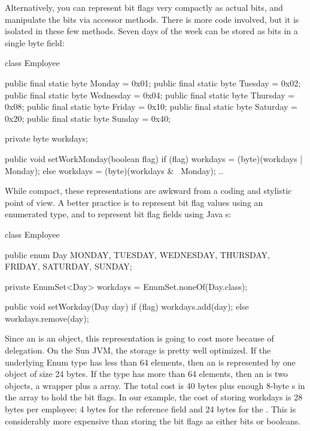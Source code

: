 Alternatively, you can represent bit flags very compactly as actual bits, and
manipulate the bits via accessor methods. There is more code involved,
but it is isolated in these few methods. Seven days of the week can be stored as
bits in a single byte field:

\begin{shortlisting}
	class Employee {
	
		public final static byte Monday = 0x01;
		public final static byte Tuesday = 0x02;
		public final static byte Wednesday = 0x04;
		public final static byte Thursday = 0x08;
		public final static byte Friday = 0x10;
		public final static byte Saturday = 0x20;
		public final static byte Sunday = 0x40;
		
		private byte workdays;
		
		public void setWorkMonday(boolean flag) {
			if (flag) {
				workdays = (byte)(workdays | Monday);
			} else {
				workdays = (byte)(workdays & ~Monday);
			}
		}
		..
   }
		       
\end{shortlisting}

While compact, these representations are awkward from a coding and
stylistic point of view. A better practice is to represent bit flag values
using an enumerated type, and to represent bit flag fields using Java
s:
\begin{shortlisting}

    class Employee {
 
		public enum Day {MONDAY, TUESDAY, WEDNESDAY, THURSDAY, FRIDAY, SATURDAY, SUNDAY};
    	
    	private EnumSet<Day> workdays = EnumSet.noneOf(Day.class);
    
   	 	public void setWorkday(Day day) {
			if (flag) {
				workdays.add(day);
			} else {
				workdays.remove(day);
			}
		}
	}
    
    
\end{shortlisting}

Since an  is an object, this representation is going to
cost more because of delegation. On the Sun JVM, the storage is pretty
well optimized. If the underlying Enum type has less than 64 elements, then an
 is represented by one object of size 24 bytes. If the
 type has more than 64 elements, then an  is two objects, a wrapper plus a
 array. The total cost is 40 bytes plus enough 8-byte
s in the array to hold the bit flags. In our example, the cost of storing workdays is 28 bytes per employee:
4 bytes for the reference field and 24 bytes for the . This is considerably
more expensive than storing the bit flags as either bits or booleans. 

